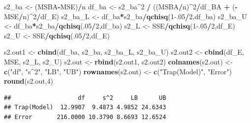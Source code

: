 \documentclass[
]{book}
\newenvironment{Shaded}{\begin{snugshade}}{\end{snugshade}}
\newcommand{\DecValTok}[1]{\textcolor[rgb]{0.00,0.00,0.81}{#1}}
\newcommand{\FloatTok}[1]{\textcolor[rgb]{0.00,0.00,0.81}{#1}}
\newcommand{\FunctionTok}[1]{\textcolor[rgb]{0.13,0.29,0.53}{\textbf{#1}}}
\newcommand{\NormalTok}[1]{#1}
\newcommand{\OtherTok}[1]{\textcolor[rgb]{0.56,0.35,0.01}{#1}}
\newcommand{\SpecialCharTok}[1]{\textcolor[rgb]{0.81,0.36,0.00}{\textbf{#1}}}
\newcommand{\StringTok}[1]{\textcolor[rgb]{0.31,0.60,0.02}{#1}}
\begin{document}
\begin{Shaded}
\begin{Highlighting}[]
\NormalTok{s2\_ba }\OtherTok{\textless{}{-}}\NormalTok{ (MSBA}\SpecialCharTok{{-}}\NormalTok{MSE)}\SpecialCharTok{/}\NormalTok{n}
\NormalTok{df\_ba }\OtherTok{\textless{}{-}}\NormalTok{ s2\_ba}\SpecialCharTok{\^{}}\DecValTok{2} \SpecialCharTok{/}\NormalTok{ ((MSBA}\SpecialCharTok{/}\NormalTok{n)}\SpecialCharTok{\^{}}\DecValTok{2}\SpecialCharTok{/}\NormalTok{df\_BA }\SpecialCharTok{+}\NormalTok{ (}\SpecialCharTok{{-}}\NormalTok{MSE}\SpecialCharTok{/}\NormalTok{n)}\SpecialCharTok{\^{}}\DecValTok{2}\SpecialCharTok{/}\NormalTok{df\_E)}
\NormalTok{s2\_ba\_L }\OtherTok{\textless{}{-}}\NormalTok{ df\_ba}\SpecialCharTok{*}\NormalTok{s2\_ba}\SpecialCharTok{/}\FunctionTok{qchisq}\NormalTok{(}\DecValTok{1}\FloatTok{{-}.05}\SpecialCharTok{/}\DecValTok{2}\NormalTok{,df\_ba)}
\NormalTok{s2\_ba\_U }\OtherTok{\textless{}{-}}\NormalTok{ df\_ba}\SpecialCharTok{*}\NormalTok{s2\_ba}\SpecialCharTok{/}\FunctionTok{qchisq}\NormalTok{(.}\DecValTok{05}\SpecialCharTok{/}\DecValTok{2}\NormalTok{,df\_ba)}
\NormalTok{s2\_L }\OtherTok{\textless{}{-}}\NormalTok{ SSE}\SpecialCharTok{/}\FunctionTok{qchisq}\NormalTok{(}\DecValTok{1}\FloatTok{{-}.05}\SpecialCharTok{/}\DecValTok{2}\NormalTok{,df\_E)}
\NormalTok{s2\_U }\OtherTok{\textless{}{-}}\NormalTok{ SSE}\SpecialCharTok{/}\FunctionTok{qchisq}\NormalTok{(.}\DecValTok{05}\SpecialCharTok{/}\DecValTok{2}\NormalTok{,df\_E)}

\NormalTok{s2.out1 }\OtherTok{\textless{}{-}} \FunctionTok{cbind}\NormalTok{(df\_ba, s2\_ba, s2\_ba\_L, s2\_ba\_U)}
\NormalTok{s2.out2 }\OtherTok{\textless{}{-}} \FunctionTok{cbind}\NormalTok{(df\_E, MSE, s2\_L, s2\_U)}
\NormalTok{s2.out }\OtherTok{\textless{}{-}} \FunctionTok{rbind}\NormalTok{(s2.out1, s2.out2)}
\FunctionTok{colnames}\NormalTok{(s2.out) }\OtherTok{\textless{}{-}} \FunctionTok{c}\NormalTok{(}\StringTok{"df"}\NormalTok{, }\StringTok{"s\^{}2"}\NormalTok{, }\StringTok{"LB"}\NormalTok{, }\StringTok{"UB"}\NormalTok{)}
\FunctionTok{rownames}\NormalTok{(s2.out) }\OtherTok{\textless{}{-}} \FunctionTok{c}\NormalTok{(}\StringTok{"Trap(Model)"}\NormalTok{, }\StringTok{"Error"}\NormalTok{)}
\FunctionTok{round}\NormalTok{(s2.out,}\DecValTok{4}\NormalTok{)}
\end{Highlighting}
\end{Shaded}

\begin{verbatim}
##                   df     s^2     LB      UB
## Trap(Model)  12.9907  9.4873 4.9852 24.6343
## Error       216.0000 10.3790 8.6693 12.6524
\end{verbatim}
\end{document}
